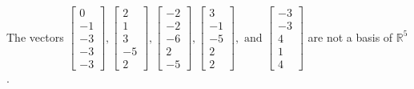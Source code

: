 \begin{exercise}
\begin{exerciseStatement}
  \end{exerciseStatement}
  \begin{exerciseAnswer}
   The vectors \(\left[\begin{array}{r}
0 \\
-1 \\
-3 \\
-3 \\
-3
\end{array}\right] , \left[\begin{array}{r}
2 \\
1 \\
3 \\
-5 \\
2
\end{array}\right] , \left[\begin{array}{r}
-2 \\
-2 \\
-6 \\
2 \\
-5
\end{array}\right] , \left[\begin{array}{r}
3 \\
-1 \\
-5 \\
2 \\
2
\end{array}\right] , \text{ and } \left[\begin{array}{r}
-3 \\
-3 \\
4 \\
1 \\
4
\end{array}\right]\) 
  	 are not  a basis of \(\mathbb{R}^5\).
  


  \end{exerciseAnswer}
\end{exercise}